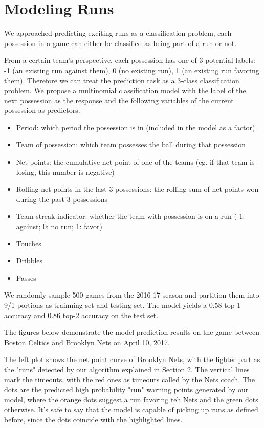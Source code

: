 \documentclass{article}
\begin{document}
\section{Modeling Runs}

We approached predicting exciting runs as a classification problem, each possession in a game can either be classified as being part of a run or not. \newline

From a certain team's perspective, each possession has one of 3 potential labels: -1 (an existing run against them), 0 (no existing run), 1 (an existing run favoring them). Therefore we can treat the prediction task as a 3-class classification problem. We propose a multinomial classification model with the label of the next possession as the response and the following variables of the current possession as predictors:\newline

\begin{itemize}
   \item  Period: which period the possession is in (included in the model as a factor)
   \item  Team of possession: which team possesses the ball during that possession
   \item  Net points: the cumulative net point of one of the teams (eg. if that team is losing, this number is negative)
   \item  Rolling net points in the last 3 possessions: the rolling sum of net points won during the past 3 possessions
   \item  Team streak indicator: whether the team with possession is on a run (-1: against; 0: no run; 1: favor)
   \item  Touches
   \item  Dribbles
   \item  Passes
\end{itemize}

We randomly sample 500 games from the 2016-17 season and partition them into 9/1 portions as trainning set and testing set. The model yields a 0.58 top-1 accuracy and 0.86 top-2 accuracy on the test set.\newline

The figures below demonstrate the model prediction results on the game between Boston Celtics and Brooklyn Nets on April 10, 2017. \newline

The left plot shows the net point curve of Brooklyn Nets, with the lighter part as the "runs" detected by our algorithm explained in Section 2. The vertical lines mark the timeouts, with the red ones as timeouts called by the Nets coach. The dots are the predicted high probability "run" warning points generated by our model, where the orange dots suggest a run favoring teh Nets and the green dots otherwise. It's safe to say that the model is capable of picking up runs as defined before, since the dots coincide with the highlighted lines. \newline
\end{document}

